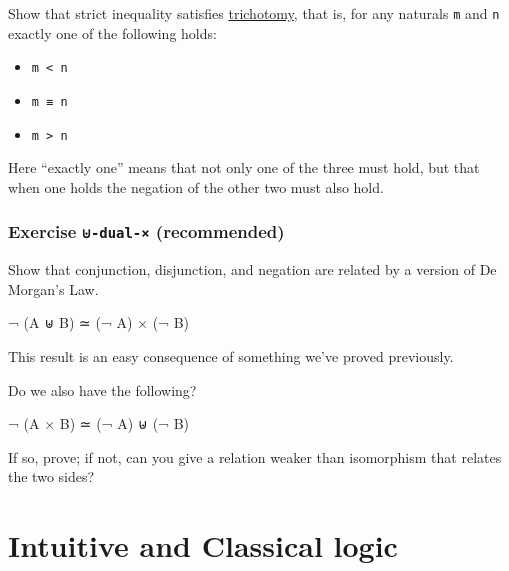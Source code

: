 Show that strict inequality satisfies
\protect\hyperlink{Relations-trichotomy}{trichotomy}, that is, for any
naturals \texttt{m} and \texttt{n} exactly one of the following holds:

\begin{itemize}
\tightlist
\item
  \texttt{m\ \textless{}\ n}
\item
  \texttt{m\ ≡\ n}
\item
  \texttt{m\ \textgreater{}\ n}
\end{itemize}

Here ``exactly one'' means that not only one of the three must hold, but
that when one holds the negation of the other two must also hold.

\begin{fence}
\begin{code}%
\>[0]\<%
\end{code}
\end{fence}

\hypertarget{exercise--dual--recommended}{%
\subsubsection{\texorpdfstring{Exercise \texttt{⊎-dual-×}
(recommended)}{Exercise ⊎-dual-× (recommended)}}\label{exercise--dual--recommended}}

Show that conjunction, disjunction, and negation are related by a
version of De Morgan's Law.

\begin{myDisplay}
¬ (A ⊎ B) ≃ (¬ A) × (¬ B)
\end{myDisplay}

This result is an easy consequence of something we've proved previously.

\begin{fence}
\begin{code}%
\>[0]\<%
\end{code}
\end{fence}

Do we also have the following?

\begin{myDisplay}
¬ (A × B) ≃ (¬ A) ⊎ (¬ B)
\end{myDisplay}

If so, prove; if not, can you give a relation weaker than isomorphism
that relates the two sides?

\hypertarget{intuitive-and-classical-logic}{%
\section{Intuitive and Classical
logic}\label{intuitive-and-classical-logic}}


